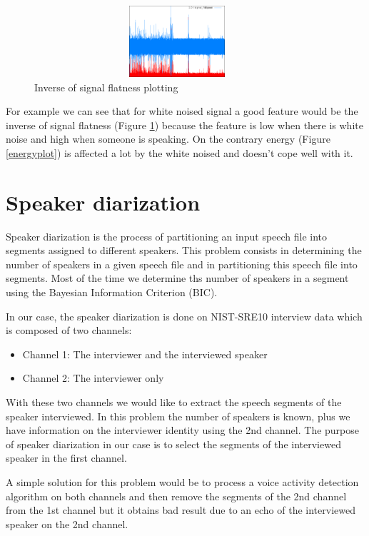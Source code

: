 \documentclass{techrep} %
\begin{document}
\begin{figure}[H]
  \centering \includegraphics[width=400px,
    height=100px]{signal_flatness}
  \caption{Inverse of signal flatness plotting}
  \label{signalflatness}
\end{figure}

For example we can see that for white noised signal a good feature
would be the inverse of signal flatness (Figure \ref{signalflatness})
because the feature is low when there is white noise and high when
someone is speaking. On the contrary energy (Figure \ref{energyplot})
is affected a lot by the white noised and doesn't cope well with it.

\section{Speaker diarization}
Speaker diarization is the process of partitioning an input speech
file into segments assigned to different speakers. This problem
consists in determining the number of speakers in a given speech file
and in partitioning this speech file into segments.  Most of the time
we determine ths number of speakers in a segment using the Bayesian Information
Criterion (BIC).

In our case, the speaker diarization is done on NIST-SRE10 interview
data which is composed of two channels:
\begin{itemize}
\item Channel 1: The interviewer and the interviewed speaker
\item Channel 2: The interviewer only
\end{itemize}
With these two channels we would like to extract the speech segments
of the speaker interviewed. In this problem the number of speakers is
known, plus we have information on the interviewer identity using the
2nd channel. The purpose of speaker diarization in our case is to
select the segments of the interviewed speaker in the first channel.

A simple solution for this problem would be to process a voice
activity detection algorithm on both channels and then remove the
segments of the 2nd channel from the 1st channel but it obtains bad
result due to an echo of the interviewed speaker on the 2nd channel.
\end{document}
